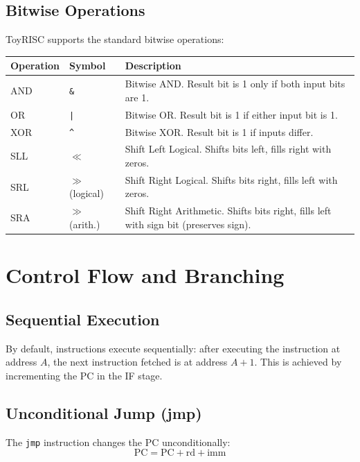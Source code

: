 \documentclass[12pt,a4paper]{article}
\begin{document}
\subsection{Bitwise Operations}

ToyRISC supports the standard bitwise operations:

\begin{longtable}{p{2cm}p{3cm}p{8cm}}
\toprule
\textbf{Operation} & \textbf{Symbol} & \textbf{Description} \\
\midrule
AND & \texttt{\&} & Bitwise AND. Result bit is 1 only if both input bits are 1. \\
OR & \texttt{|} & Bitwise OR. Result bit is 1 if either input bit is 1. \\
XOR & \texttt{\^{}} & Bitwise XOR. Result bit is 1 if inputs differ. \\
SLL & $\ll$ & Shift Left Logical. Shifts bits left, fills right with zeros. \\
SRL & $\gg$ (logical) & Shift Right Logical. Shifts bits right, fills left with zeros. \\
SRA & $\gg$ (arith.) & Shift Right Arithmetic. Shifts bits right, fills left with sign bit (preserves sign). \\
\bottomrule
\end{longtable}

\newpage
\section{Control Flow and Branching}

\subsection{Sequential Execution}

By default, instructions execute sequentially: after executing the instruction at address $A$, the next instruction fetched is at address $A + 1$. This is achieved by incrementing the PC in the IF stage.

\subsection{Unconditional Jump (jmp)}

The \texttt{jmp} instruction changes the PC unconditionally:
\[
\text{PC} = \text{PC} + \text{rd} + \text{imm}
\]
\end{document}
